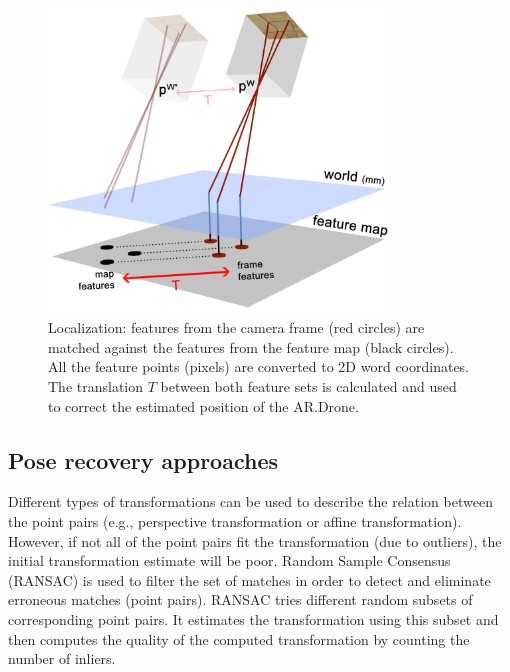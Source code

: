\begin{figure}[htb]
\centering
\includegraphics[width=9cm]{images/localization1.png}
\caption{Localization: features from the camera frame (red circles) are matched against the features from the feature map (black circles). All the feature points (pixels) are converted to 2D word coordinates. The translation $T$ between both feature sets is calculated and used to correct the estimated position of the AR.Drone.}
\label{fig:localization1}
\end{figure}







\subsection{Pose recovery approaches}
\label{sec:pose-recovery}
Different types of transformations can be used to describe the relation between the point pairs (e.g., perspective transformation or affine transformation).
However, if not all of the point pairs fit the transformation (due to outliers), the initial transformation estimate will be poor.
Random Sample Consensus (RANSAC) \cite{fischler1981random} is used to filter the set of matches in order to detect and eliminate erroneous matches (point pairs).
RANSAC tries different random subsets of corresponding point pairs.
It estimates the transformation using this subset and then computes the quality of the computed transformation by counting the number of inliers.

